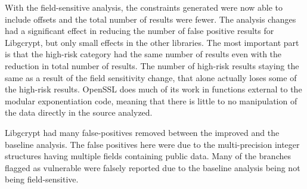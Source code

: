 \documentclass[11pt,a4paper]{article}
\begin{document}
With the field-sensitive analysis, the constraints generated were now able to
include offsets and the total number of results were fewer. The analysis changes
had a significant effect in reducing the number of false positive results for
Libgcrypt, but only small effects in the other libraries. The most important
part is that the high-risk category had the same number of results even with the
reduction in total number of results. The number of high-risk results staying
the same as a result of the field sensitivity change, that alone actually loses
some of the high-risk results. OpenSSL does much of its work in functions
external to the modular exponentiation code, meaning that there is little to no
manipulation of the data directly in the source analyzed.

\begin{table}
  \centering
  \caption{Stage 1 Classification - Field Sensitive (Improved) Analysis: TP -
    Total Positives, TP\textsubscript{WL} - Total Positives with Whitelist, FP - False Positive, V - Validation, LR - Low-Risk, HR - High-Risk}
  \label{tbl:first-stage-with-offset}
\end{table}


Libgcrypt had many false-positives removed between the improved and the baseline
analysis. The false positives here were due to the multi-precision integer
structures having multiple fields containing public data. Many of the branches
flagged as vulnerable were falsely reported due to the baseline analysis being
not being field-sensitive.
\end{document}
